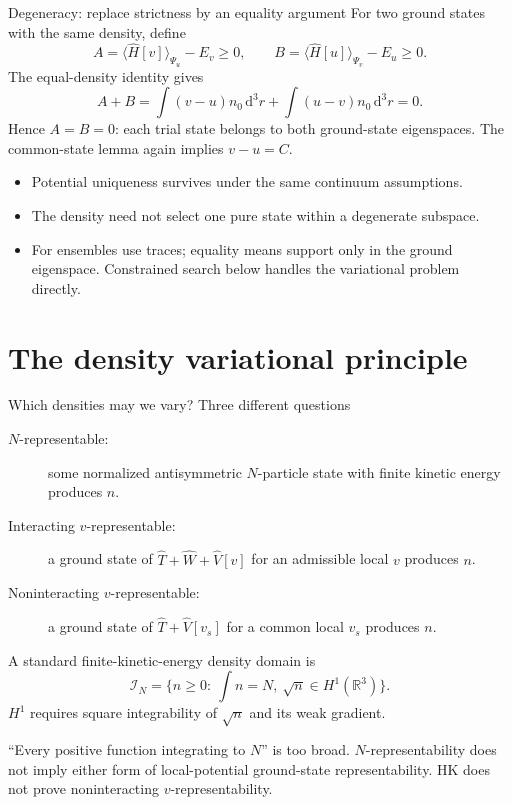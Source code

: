 \documentclass[aspectratio=169,10pt]{beamer}
\newcommand{\warnbox}[1]{\begin{tcolorbox}[colback=palewarm,colframe=warm,title={A trap to avoid}]#1\end{tcolorbox}}
\newcommand{\dd}{\,\mathrm d}
\newcommand{\avg}[1]{\langle #1\rangle}
\begin{document}
\begin{frame}{Degeneracy: replace strictness by an equality argument}
For two ground states with the same density, define
\[
 A=\avg{\hat H[v]}_{\Psi_u}-E_v\geq0,\qquad
 B=\avg{\hat H[u]}_{\Psi_v}-E_u\geq0.
\]
The equal-density identity gives
\[
 A+B=\int(v-u)n_0\dd^3r+\int(u-v)n_0\dd^3r=0.
\]
Hence $A=B=0$: each trial state belongs to both ground-state eigenspaces.
The common-state lemma again implies $v-u=C$.
\begin{itemize}
\item Potential uniqueness survives under the same continuum assumptions.
\item The density need not select one pure state within a degenerate subspace.
\item For ensembles use traces; equality means support only in the ground
eigenspace. Constrained search below handles the variational problem directly.
\end{itemize}
\end{frame}

\section[Density variational principle]{The density variational principle}
\begin{frame}{Which densities may we vary? Three different questions}
\begin{description}
\item[$N$-representable:] some normalized antisymmetric $N$-particle state
with finite kinetic energy produces $n$.
\item[Interacting $v$-representable:] a ground state of $\hat T+\hat W+\hat V[v]$
for an admissible local $v$ produces $n$.
\item[Noninteracting $v$-representable:] a ground state of
$\hat T+\hat V[v_s]$ for a common local $v_s$ produces $n$.
\end{description}
A standard finite-kinetic-energy density domain is
\[
 \mathcal I_N=\{n\geq0:\ \int n=N,\ \sqrt n\in H^1(\mathbb R^3)\}.
\]
$H^1$ requires square integrability of $\sqrt n$ and its weak gradient.
\warnbox{``Every positive function integrating to $N$'' is too broad.
$N$-representability does not imply either form of local-potential ground-state
representability. HK does not prove noninteracting $v$-representability.}
\end{frame}
\end{document}
